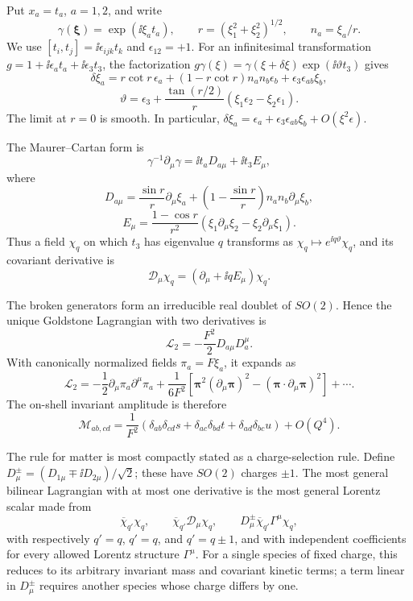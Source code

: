 \ExerciseEditorialNote

\begin{enumerate}
  Put \(x_a=t_a\), \(a=1,2\), and write
  \[
    \gamma(\boldsymbol\xi)
      =\exp(\ii\xi_at_a),\qquad
    r=(\xi_1^2+\xi_2^2)^{1/2},\qquad
    n_a=\xi_a/r.
  \]
  We use \([t_i,t_j]=\ii\epsilon_{ijk}t_k\) and
  \(\epsilon_{12}=+1\).  For an infinitesimal transformation
  \(g=1+\ii\epsilon_at_a+\ii\epsilon_3t_3\), the factorization
  \(g\gamma(\xi)=\gamma(\xi+\delta\xi)\exp(\ii\vartheta t_3)\)
  gives
  \[
    \boxed{\delta\xi_a
      =r\cot r\,\epsilon_a
       +(1-r\cot r)n_a n_b\epsilon_b
       +\epsilon_3\epsilon_{ab}\xi_b,}
  \]
  \[
    \vartheta=\epsilon_3+
      \frac{\tan(r/2)}{r}
      (\xi_1\epsilon_2-\xi_2\epsilon_1).
  \]
  The limit at \(r=0\) is smooth.  In particular,
  \(\delta\xi_a=\epsilon_a+\epsilon_3\epsilon_{ab}\xi_b
  +O(\xi^2\epsilon)\).

  The Maurer--Cartan form is
  \[
    \gamma^{-1}\partial_\mu\gamma
      =\ii t_aD_{a\mu}+\ii t_3E_\mu,
  \]
  where
  \[
    \boxed{D_{a\mu}
      =\frac{\sin r}{r}\partial_\mu\xi_a
       +\left(1-\frac{\sin r}{r}\right)
       n_a n_b\partial_\mu\xi_b,}
  \]
  \[
    \boxed{E_\mu
      =\frac{1-\cos r}{r^2}
       (\xi_1\partial_\mu\xi_2-\xi_2\partial_\mu\xi_1).}
  \]
  Thus a field \(\chi_q\) on which \(t_3\) has eigenvalue \(q\)
  transforms as
  \(\chi_q\mapsto e^{\ii q\vartheta}\chi_q\), and its covariant derivative is
  \[
    \boxed{\mathcal D_\mu\chi_q
      =(\partial_\mu+\ii qE_\mu)\chi_q.}
  \]

  The broken generators form an irreducible real doublet of \(SO(2)\).
  Hence the unique Goldstone Lagrangian with two derivatives is
  \[
    \mathcal L_2=-\frac{F^2}{2}D_{a\mu}D_a^\mu.
  \]
  With canonically normalized fields \(\pi_a=F\xi_a\), it expands as
  \[
    \mathcal L_2=-\frac12\partial_\mu\pi_a\partial^\mu\pi_a
      +\frac{1}{6F^2}
       \left[
        \boldsymbol\pi^2(\partial_\mu\boldsymbol\pi)^2
        -(\boldsymbol\pi\cdot\partial_\mu\boldsymbol\pi)^2
       \right]+\cdots.
  \]
  The on-shell invariant amplitude is therefore
  \[
    \boxed{\mathcal M_{ab,cd}
      =\frac1{F^2}\left(
       \delta_{ab}\delta_{cd}s+
       \delta_{ac}\delta_{bd}t+
       \delta_{ad}\delta_{bc}u\right)+O(Q^4).}
  \]

  The rule for matter is most compactly stated as a charge-selection
  rule.  Define \(D_\mu^\pm=(D_{1\mu}\mp \ii D_{2\mu})/\sqrt2\); these have
  \(SO(2)\) charges \(\pm1\).  The most general bilinear Lagrangian with
  at most one derivative is the most general Lorentz scalar made from
  \[
    \overline\chi_{q'}\chi_q,\qquad
    \overline\chi_{q'}\mathcal D_\mu\chi_q,\qquad
    D_\mu^\pm\overline\chi_{q'}\Gamma^\mu\chi_q,
  \]
  with respectively \(q'=q\), \(q'=q\), and
  \(q'=q\pm1\), and with independent coefficients for every allowed
  Lorentz structure \(\Gamma^\mu\).  For a single species of fixed
  charge, this reduces to its arbitrary invariant mass and covariant
  kinetic terms; a term linear in \(D^\pm_\mu\) requires another species
  whose charge differs by one.


\end{enumerate}
